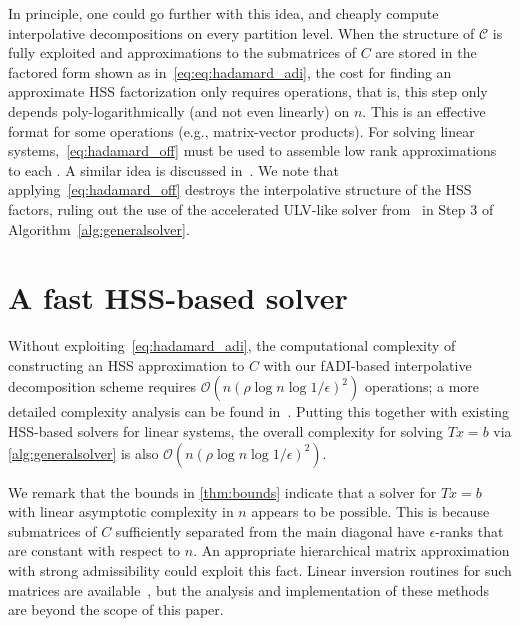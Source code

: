 In principle, one could go further with this idea, and cheaply compute interpolative decompositions  on every partition level. When the structure of $\mathscr{C}$ is fully exploited and approximations to the submatrices of $C$ are stored in the factored form shown as in~\eqref{eq:eq:hadamard_adi}, the cost for finding an approximate HSS factorization only requires  operations, that is, this step only depends poly-logarithmically (and not even linearly) on $n$.  This is an effective format for some operations (e.g., matrix-vector products). For solving linear systems,~\eqref{eq:hadamard_off} must be used to assemble low rank approximations to each . A similar idea is discussed in~\cite{chandrasekaran2007superfast, xia2012superfast}. We note that applying~\eqref{eq:hadamard_off} destroys the interpolative structure of the HSS factors, ruling out the use of the accelerated ULV-like solver from~\cite{xia2012superfast} in Step 3 of Algorithm~\ref{alg:generalsolver}.

\section{A fast HSS-based solver} \label{sec:practicalsolver}

Without exploiting~\eqref{eq:hadamard_adi}, the computational complexity of constructing an HSS approximation to $C$ with our fADI-based interpolative decomposition scheme requires $\mathcal{O}(n (\rho \log n \log 1/\epsilon )^2 )$ operations; a more detailed complexity
analysis can be found in~\cite[Ch.~4]{wilber2021computing}. Putting this together with existing HSS-based solvers for linear systems, the overall complexity for solving $Tx = b$ via \cref{alg:generalsolver} is also $\mathcal{O}(n (\rho \log n \log 1/\epsilon )^2 )$. 

We remark that the bounds in \cref{thm:bounds} indicate that a solver for $Tx=b$ with linear asymptotic complexity in $n$ appears to be possible. This is because submatrices of $C$ sufficiently separated from the main diagonal have $\epsilon$-ranks that are constant with respect to $n$. An appropriate hierarchical matrix approximation with strong admissibility could exploit this fact. Linear inversion routines for such matrices are available~\cite{ambikasaran2014inverse, minden2017recursive}, but the analysis and implementation of these methods are beyond the scope of this paper.


 
 


